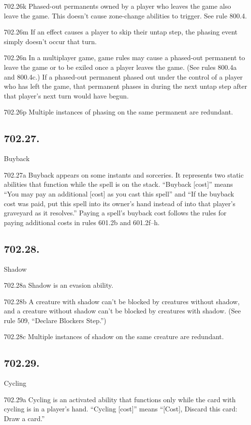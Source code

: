 702.26k Phased-out permanents owned by a player who leaves the game also leave the game. This doesn’t cause zone-change abilities to trigger. See rule 800.4.

702.26m If an effect causes a player to skip their untap step, the phasing event simply doesn’t occur that turn.

702.26n In a multiplayer game, game rules may cause a phased-out permanent to leave the game or to be exiled once a player leaves the game. (See rules 800.4a and 800.4c.) If a phased-out permanent phased out under the control of a player who has left the game, that permanent phases in during the next untap step after that player’s next turn would have begun.

702.26p Multiple instances of phasing on the same permanent are redundant.

\subsection*{702.27.}
Buyback

702.27a Buyback appears on some instants and sorceries. It represents two static abilities that function while the spell is on the stack. “Buyback [cost]” means “You may pay an additional [cost] as you cast this spell” and “If the buyback cost was paid, put this spell into its owner’s hand instead of into that player’s graveyard as it resolves.” Paying a spell’s buyback cost follows the rules for paying additional costs in rules 601.2b and 601.2f–h.

\subsection*{702.28.}
Shadow

702.28a Shadow is an evasion ability.

702.28b A creature with shadow can’t be blocked by creatures without shadow, and a creature without shadow can’t be blocked by creatures with shadow. (See rule 509, “Declare Blockers Step.”)

702.28c Multiple instances of shadow on the same creature are redundant.

\subsection*{702.29.}
Cycling

702.29a Cycling is an activated ability that functions only while the card with cycling is in a player’s hand. “Cycling [cost]” means “[Cost], Discard this card: Draw a card.”

